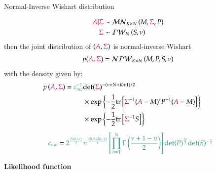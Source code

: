 \documentclass[notes,blackandwhite,mathsans,usenames,dvipsnames]{beamer}
\begin{document}
\begin{frame}{Normal-Inverse Wishart distribution}

\begin{align*}
{\color{purple}A}|{\color{purple}\Sigma} &\sim\mathcal{MN}_{K\times N}\left( M, {\color{purple}\Sigma}, P \right)\\
{\color{purple}\Sigma} &\sim \mathcal{IW}_{N}\left( S, \nu \right)
\end{align*}
{\color{mcxs2}then the joint distribution of} $({\color{purple}A},{\color{purple}\Sigma})$ {\color{mcxs2}is} {\color{mcxs1}normal-inverse Wishart}
$$
p({\color{purple}A},{\color{purple}\Sigma}) = \mathcal{NIW}_{K\times N}\left( M,P,S,\nu\right)
$$
{\color{mcxs2}with the density given by:}
\begin{align*}
p\left( {\color{purple}A},{\color{purple}\Sigma} \right) = {\color{mcxs2}c_{nw}^{-1}}&\text{det}({\color{purple}\Sigma})^{-(\nu+N+K+1)/2}\\ 
&\times\exp\left\{ -\frac{1}{2}\text{tr}\left[ {\color{purple}\Sigma}^{-1} ({\color{purple}A}-M)'P^{-1}({\color{purple}A}-M) \right] \right\}\\
&\times\exp\left\{ -\frac{1}{2}\text{tr}\left[ {\color{purple}\Sigma}^{-1} S \right] \right\}\\[1ex]
{\color{mcxs2}c_{nw}} = {\color{mcxs2}2^{\frac{N(K+\nu)}{2}}}&{\color{mcxs2}\pi^{\frac{N(N+2K-1)}{4}}\left[\prod_{n=1}^{N}\Gamma\left(\frac{\nu+1-n}{2} \right)\right]\text{det}(P)^{\frac{N}{2}}\text{det}(S)^{-\frac{\nu}{2}}}
\end{align*}

\end{frame}














{
\begin{frame}

\begin{adjustwidth}{-0.5cm}{0cm}
\vspace{8.3cm}\Large
\textbf{{\color{mcxs1}Likelihood} {\color{mcxs4}function}}
\end{adjustwidth}

\end{frame}
}
\end{document}

